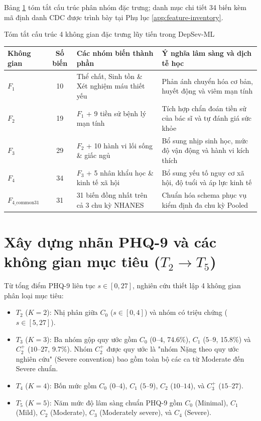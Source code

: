 Bảng \ref{tab:feature-summary} tóm tắt cấu trúc phân nhóm đặc trưng; danh mục chi tiết 34 biến kèm mã định danh CDC được trình bày tại Phụ lục \ref{app:feature-inventory}.

\begin{table}{Tóm tắt cấu trúc 4 không gian đặc trưng lũy tiến trong DepSev-ML}
\centering
\footnotesize
\setlength{\tabcolsep}{4pt}
\label{tab:feature-summary}
\begin{tabularx}{\textwidth}{l c p{5.5cm} X}
\toprule
\textbf{Không gian} & \textbf{Số biến} & \textbf{Các nhóm biến thành phần} & \textbf{Ý nghĩa lâm sàng và dịch tễ học} \\
\midrule
$F_1$ & 10 & Thể chất, Sinh tồn \& Xét nghiệm máu thiết yếu & Phản ánh chuyển hóa cơ bản, huyết động và viêm mạn tính \\
$F_2$ & 19 & $F_1$ + 9 tiền sử bệnh lý mạn tính & Tích hợp chẩn đoán tiền sử của bác sĩ và tự đánh giá sức khỏe \\
$F_3$ & 29 & $F_2$ + 10 hành vi lối sống \& giấc ngủ & Bổ sung nhịp sinh học, mức độ vận động và hành vi kích thích \\
$F_4$ & 34 & $F_3$ + 5 nhân khẩu học \& kinh tế xã hội & Bổ sung yếu tố nguy cơ xã hội, độ tuổi và áp lực kinh tế \\
\midrule
$F_{4\_\text{common31}}$ & 31 & 31 biến đồng nhất trên cả 3 chu kỳ NHANES & Chuẩn hóa schema phục vụ kiểm định đa chu kỳ Pooled \\
\bottomrule
\end{tabularx}
\end{table}

\section{Xây dựng nhãn PHQ-9 và các không gian mục tiêu ($T_2 \to T_5$)}
\label{sec:nhan-muc-tieu}

Từ tổng điểm PHQ-9 liên tục $s \in [0, 27]$, nghiên cứu thiết lập 4 không gian phân loại mục tiêu:
\begin{itemize}
    \item $T_2$ ($K=2$): Nhị phân giữa $C_0$ ($s \in [0, 4]$) và nhóm có triệu chứng ($s \in [5, 27]$).
    \item $T_3$ ($K=3$): Ba nhóm gộp quy ước gồm $C_0$ ($0$--$4$, 74.6\%), $C_1$ ($5$--$9$, 15.8\%) và $C_2^+$ ($10$--$27$, 9.7\%). Nhóm $C_2^+$ được quy ước là "nhóm Nặng theo quy ước nghiên cứu" (Severe convention) bao gồm toàn bộ các ca từ Moderate đến Severe chuẩn.
    \item $T_4$ ($K=4$): Bốn mức gồm $C_0$ ($0$--$4$), $C_1$ ($5$--$9$), $C_2$ ($10$--$14$), và $C_3^+$ ($15$--$27$).
    \item $T_5$ ($K=5$): Năm mức độ lâm sàng chuẩn PHQ-9 gồm $C_0$ (Minimal), $C_1$ (Mild), $C_2$ (Moderate), $C_3$ (Moderately severe), và $C_4$ (Severe).
\end{itemize}

